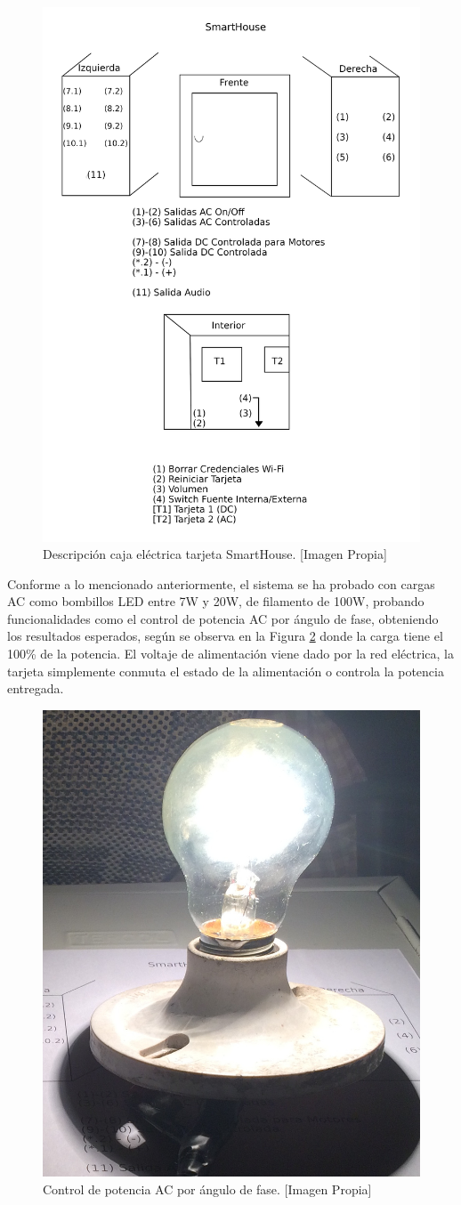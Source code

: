 \begin{figure}
	\centering
	\caption[Descripción caja eléctrica tarjeta SmartHouse.]{Descripción caja eléctrica tarjeta SmartHouse. [Imagen Propia]}
	\label{fig:labels}
	\includegraphics[width=0.7\linewidth]{Imagenes/labels}
\end{figure}

Conforme a lo mencionado anteriormente, el sistema se ha probado con cargas AC como bombillos LED entre 7W y 20W, de filamento de 100W, probando funcionalidades como el control de potencia AC por ángulo de fase, obteniendo los resultados esperados, según se observa en la Figura \ref{fig:ACc} donde la carga tiene el 100\% de la potencia. El voltaje de alimentación viene dado por la red eléctrica, la tarjeta simplemente conmuta el estado de la alimentación o controla la potencia entregada.\\

\begin{figure}[H]
	\centering
	\caption[Control de potencia AC por ángulo de fase.]{Control de potencia AC por ángulo de fase. [Imagen Propia]}
	\label{fig:ACc}
	\includegraphics[width=0.3\linewidth]{Imagenes/AC1}
\end{figure}

